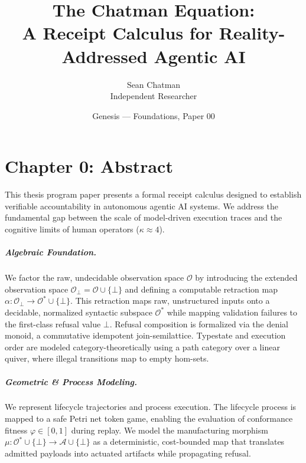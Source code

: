 \documentclass[11pt,oneside]{book}
\title{\bfseries The Chatman Equation:\\[0.4em]
\large A Receipt Calculus for Reality-Addressed Agentic AI}
\author{Sean Chatman \\ Independent Researcher}
\date{Genesis --- Foundations, Paper 00}
\theoremstyle{definition}
\theoremstyle{plain}
\theoremstyle{remark}
\begin{document}
\frontmatter
\maketitle

\chapter{Chapter 0: Abstract}
\label{ch:abstract}

This thesis program paper presents a formal receipt calculus designed to establish verifiable accountability in autonomous agentic AI systems. %
We address the fundamental gap between the scale of model-driven execution traces and the cognitive limits of human operators ($\kappa \approx 4$). %

\paragraph{Algebraic Foundation.}
We factor the raw, undecidable observation space $\mathcal{O}$ by introducing the extended observation space $\mathcal{O}_\bot = \mathcal{O} \cup \{\bot\}$ and defining a computable retraction map $\alpha: \mathcal{O}_\bot \to \mathcal{O}^* \cup \{\bot\}$. %
This retraction maps raw, unstructured inputs onto a decidable, normalized syntactic subspace $\mathcal{O}^*$ while mapping validation failures to the first-class refusal value $\bot$. %
Refusal composition is formalized via the denial monoid, a commutative idempotent join-semilattice. %
Typestate and execution order are modeled category-theoretically using a path category over a linear quiver, where illegal transitions map to empty hom-sets. %

\paragraph{Geometric \& Process Modeling.}
We represent lifecycle trajectories and process execution. %
The lifecycle process is mapped to a safe Petri net token game, enabling the evaluation of conformance fitness $\varphi \in [0, 1]$ during replay. %
We model the manufacturing morphism $\mu: \mathcal{O}^* \cup \{\bot\} \to \mathcal{A} \cup \{\bot\}$ as a deterministic, cost-bounded map that translates admitted payloads into actuated artifacts while propagating refusal. %
\end{document}
